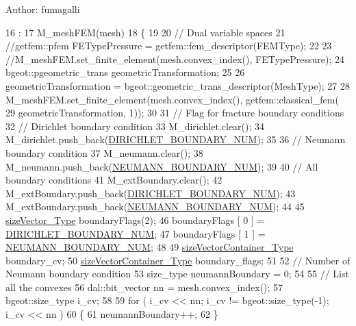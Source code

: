Author\-: fumagalli 
\begin{DoxyCode}
16                                              :
17     M\_meshFEM(mesh)
18 \{
19 
20     \textcolor{comment}{// Dual variable spaces}
21     \textcolor{comment}{//getfem::pfem FETypePressure = getfem::fem\_descriptor(FEMType);}
22 
23     \textcolor{comment}{//M\_meshFEM.set\_finite\_element(mesh.convex\_index(), FETypePressure);}
24     bgeot::pgeometric\_trans geometricTransformation;
25 
26     geometricTransformation = bgeot::geometric\_trans\_descriptor(MeshType);
27 
28     M\_meshFEM.set\_finite\_element(mesh.convex\_index(), getfem::classical\_fem(
29             geometricTransformation, 1));
30 
31     \textcolor{comment}{// Flag for fracture boundary conditions}
32     \textcolor{comment}{// Dirichlet boundary condition}
33     M\_dirichlet.clear();
34     M\_dirichlet.push\_back(\hyperlink{classBC_ad1b507696802f73b95c0ca59f4c41390a99103ccd54ba29b1bd2670cc6cd0c462}{DIRICHLET\_BOUNDARY\_NUM});
35 
36     \textcolor{comment}{// Neumann boundary condition}
37     M\_neumann.clear();
38     M\_neumann.push\_back(\hyperlink{classBC_ad1b507696802f73b95c0ca59f4c41390a432aa77a00d8eb4929463ef8d57b5c04}{NEUMANN\_BOUNDARY\_NUM});
39 
40     \textcolor{comment}{// All boundary conditions}
41     M\_extBoundary.clear();
42     M\_extBoundary.push\_back(\hyperlink{classBC_ad1b507696802f73b95c0ca59f4c41390a99103ccd54ba29b1bd2670cc6cd0c462}{DIRICHLET\_BOUNDARY\_NUM});
43     M\_extBoundary.push\_back(\hyperlink{classBC_ad1b507696802f73b95c0ca59f4c41390a432aa77a00d8eb4929463ef8d57b5c04}{NEUMANN\_BOUNDARY\_NUM});
44 
45     \hyperlink{Core_8h_a83c51913d041a5001e8683434c09857f}{sizeVector\_Type} boundaryFlags(2);
46     boundaryFlags [ 0 ] = \hyperlink{classBC_ad1b507696802f73b95c0ca59f4c41390a99103ccd54ba29b1bd2670cc6cd0c462}{DIRICHLET\_BOUNDARY\_NUM};
47     boundaryFlags [ 1 ] = \hyperlink{classBC_ad1b507696802f73b95c0ca59f4c41390a432aa77a00d8eb4929463ef8d57b5c04}{NEUMANN\_BOUNDARY\_NUM};
48 
49     \hyperlink{Core_8h_a80e8381d86ecb0a7f4f87ff84d1a0be5}{sizeVectorContainer\_Type} boundary\_cv;
50     \hyperlink{Core_8h_a80e8381d86ecb0a7f4f87ff84d1a0be5}{sizeVectorContainer\_Type} boundary\_flags;
51 
52     \textcolor{comment}{// Number of Neumann boundary condition}
53     size\_type neumannBoundary = 0;
54 
55     \textcolor{comment}{// List all the convexes}
56     dal::bit\_vector nn = mesh.convex\_index();
57     bgeot::size\_type i\_cv;
58 
59     \textcolor{keywordflow}{for} ( i\_cv << nn; i\_cv != bgeot::size\_type(-1); i\_cv << nn )
60     \{
61         neumannBoundary++;
62     \}

\end{DoxyCode}
